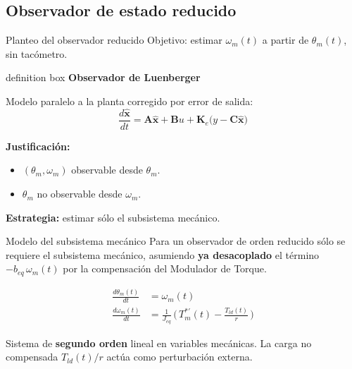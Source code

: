\documentclass[aspectratio=169,t]{beamer}
\newcommand{\definitionbox}[2]{%
  \begin{beamercolorbox}[wd=\linewidth,sep=0.9ex,leftskip=0.9ex,rightskip=0.9ex]{definition box}%
    {\small\bfseries\color{uncBlue}#1}\par\vspace{0.2mm}%
    {\small #2}%
  \end{beamercolorbox}%
}
\begin{document}
\subsection{Observador de estado reducido}



\begin{frame}{Planteo del observador reducido}
{\small\color{uncGray}Objetivo: estimar $\omega_m(t)$ a partir de $\theta_m(t)$, sin tacómetro.}\par
\vspace{3mm}

\definitionbox{Observador de Luenberger}{
Modelo paralelo a la planta corregido por error de salida:
\[
\frac{d\hat{\bm{x}}}{dt}=\bm{A}\hat{\bm{x}}+\bm{B}u+\bm{K}_e\big(y-\bm{C}\hat{\bm{x}}\big)
\]
}

\vspace{3mm}
\textbf{Justificación:}
\begin{itemize}
\item $(\theta_m,\omega_m)$ observable desde $\theta_m$.
\item $\theta_m$ no observable desde $\omega_m$.
\end{itemize}

\vspace{2mm}
\textbf{Estrategia:} estimar sólo el subsistema mecánico.
\end{frame}

\begin{frame}{Modelo del subsistema mecánico}
{\small\color{uncGray}Para un observador de orden reducido sólo se requiere el subsistema mecánico, asumiendo \textbf{ya desacoplado} el término $-b_{eq}\,\omega_m(t)$ por la compensación del Modulador de Torque.}\par
\vspace{8mm}

\begin{align*}
\frac{d\theta_m(t)}{dt} &= \omega_m(t) \\[6pt]
\frac{d\omega_m(t)}{dt} &= \frac{1}{J_{eq}}\,\Big(\,T_m^{*\prime}(t) - \frac{T_{ld}(t)}{r}\,\Big)
\end{align*}

\vspace{6mm}
{\small Sistema de \textbf{segundo orden} lineal en variables mecánicas. La carga no compensada $T_{ld}(t)/r$ actúa como perturbación externa.}
\end{frame}
\end{document}
